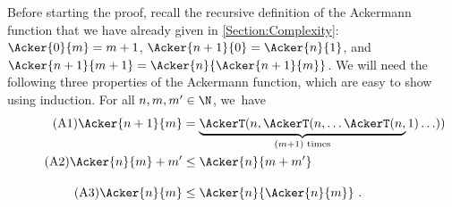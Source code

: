 \documentclass[../../diss.tex]{subfiles}
\begin{document}
Before starting the proof, recall the recursive definition of the Ackermann function that we have already given in \cref{Section:Complexity}:
$\Acker{0}{m} = m + 1 $,
$\Acker{n+1}{0} = \Acker{n}{1}$, and
$\Acker{n+1}{m+1} = \Acker{n}{\Acker{n+1}{m}}$.
We will need the following three properties of the Ackermann function, which are easy to show using induction.
For all $n, m, m' \in \N$, we~have
\begin{align}
    \label{Equation:AckerOne}\tag{A1}%
    \Acker{n+1}{m}
    &=
    \underbrace{ \AckerT(n, \AckerT(n, \ldots \AckerT(n, }_{(m+1) \text{ times}} 1) \ldots ))
\\
    \label{Equation:AckerTwo}\tag{A2}%
    \Acker{n}{m} + m' &\leq \Acker{n}{m + m'}
\\[1em]
    \label{Equation:AckerThree}\tag{A3}%
    \Acker{n}{m} &\leq \Acker{n}{\Acker{n}{m}}
    \ .
\end{align}
\end{document}

